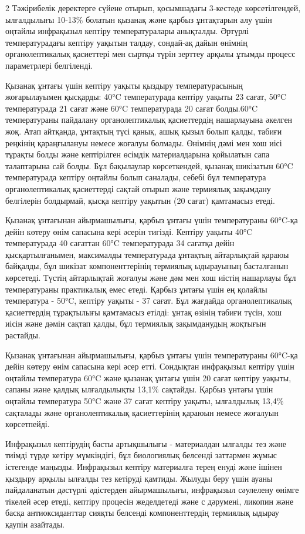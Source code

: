 \begin{multicols}{2}
Тәжірибелік деректерге сүйене отырып, қосымшадағы 3-кестеде
көрсетілгендей, ылғалдылығы 10-13\% болатын қызанақ және қарбыз
ұнтақтарын алу үшін оңтайлы инфрақызыл кептіру температуралары
анықталды. Әртүрлі температурадағы кептіру уақытын талдау, сондай-ақ
дайын өнімнің органолептикалық қасиеттері мен сыртқы түрін зерттеу
арқылы ұтымды процесс параметрлері белгіленді.

Қызанақ ұнтағы үшін кептіру уақыты қыздыру температурасының
жоғарылауымен қысқарды: 40°C температурада кептіру уақыты 23 сағат, 50°C
температурада 21 сағат және 60°C температурада 20 сағат болды.60°C
температураны пайдалану органолептикалық қасиеттердің нашарлауына
әкелген жоқ. Атап айтқанда, ұнтақтың түсі қанық, ашық қызыл болып қалды,
табиғи реңкінің қараңғылануы немесе жоғалуы болмады. Өнімнің дәмі мен
хош иісі тұрақты болды және кептірілген өсімдік материалдарына қойылатын
сапа талаптарына сай болды. Бұл бақылаулар көрсеткендей, қызанақ
шикізатын 60°C температурада кептіру оңтайлы болып саналады, себебі бұл
температура органолептикалық қасиеттерді сақтай отырып және термиялық
зақымдану белгілерін болдырмай, қысқа кептіру уақытын (20 сағат)
қамтамасыз етеді.

Қызанақ ұнтағынан айырмашылығы, қарбыз ұнтағы үшін температураны 60°C-қа
дейін көтеру өнім сапасына кері әсерін тигізді. Кептіру уақыты 40°C
температурада 40 сағаттан 60°C температурада 34 сағатқа дейін
қысқартылғанымен, максималды температурада ұнтақтың айтарлықтай қараюы
байқалды, бұл шикізат компоненттерінің термиялық ыдырауының басталғанын
көрсетеді. Түстің айтарлықтай жоғалуы және дәм мен хош иістің нашарлауы
бұл температураны практикалық емес етеді. Қарбыз ұнтағы үшін ең қолайлы
температура - 50°C, кептіру уақыты - 37 сағат. Бұл жағдайда
органолептикалық қасиеттердің тұрақтылығы қамтамасыз етілді: ұнтақ
өзінің табиғи түсін, хош иісін және дәмін сақтап қалды, бұл термиялық
зақымданудың жоқтығын растайды.

Қызанақ ұнтағынан айырмашылығы, қарбыз ұнтағы үшін температураны 60°C-қа
дейін көтеру өнім сапасына кері әсер етті. Сондықтан инфрақызыл кептіру
үшін оңтайлы температура 60°C және қызанақ ұнтағы үшін 20 сағат кептіру
уақыты, сапаны және қалдық ылғалдылықты 13,1\% сақтайды. Қарбыз ұнтағы
үшін оңтайлы температура 50°C және 37 сағат кептіру уақыты, ылғалдылық
13,4\% сақталады және органолептикалық қасиеттерінің қараюын немесе
жоғалуын көрсетпейді.

Инфрақызыл кептірудің басты артықшылығы - материалдан ылғалды тез және
тиімді түрде кетіру мүмкіндігі, бұл биологиялық белсенді заттармен жұмыс
істегенде маңызды. Инфрақызыл кептіру материалға терең енуді және ішінен
қыздыру арқылы ылғалды тез кетіруді қамтиды. Жылуды беру үшін ауаны
пайдаланатын дәстүрлі әдістерден айырмашылығы, инфрақызыл сәулелену
өнімге тікелей әсер етеді, кептіру процесін жеделдетеді және с дәрумені,
ликопин және басқа антиоксиданттар сияқты белсенді компоненттердің
термиялық ыдырау қаупін азайтады.


\end{multicols}

